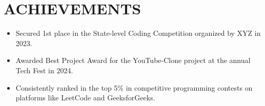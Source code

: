 \documentclass[letterpaper,11pt]{article}
\newcommand{\resumeItem}[1]{
	\item\small{
		{#1 \vspace{-2pt}}
	}
}
\newcommand{\resumeSubHeadingListStart}{\begin{itemize}[leftmargin=0.0in, label={}]}
\newcommand{\resumeSubHeadingListEnd}{\end{itemize}}
\newcommand{\resumeItemListStart}{\begin{itemize}}
\newcommand{\resumeItemListEnd}{\end{itemize}\vspace{-5pt}}
\begin{document}
	\section{ACHIEVEMENTS}
	\resumeSubHeadingListStart
	\resumeItemListStart
	\resumeItem{Secured 1st place in the State-level Coding Competition organized by XYZ in 2023.}
	\resumeItem{Awarded Best Project Award for the YouTube-Clone project at the annual Tech Fest in 2024.}
	\resumeItem{Consistently ranked in the top 5\% in competitive programming contests on platforms like LeetCode and GeeksforGeeks.}
	\resumeItemListEnd
	\resumeSubHeadingListEnd
\end{document}

